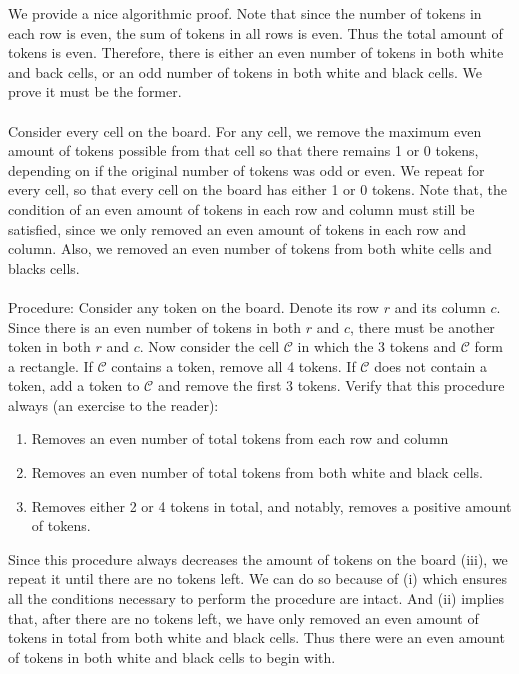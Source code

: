 \begin{enumerate}[align=left,start=1,label=\textbf{\textcolor{meablue}{Problem \arabic*}}]
    \begin{solution}
        We provide a nice algorithmic proof. Note that since the number of tokens in each row is even, the sum of tokens in all rows is even.  Thus the total amount of tokens is even. Therefore, there is either an even number of tokens in both white and back cells, or an odd number of tokens in both white and black cells. We prove it must be the former. 
        \\ \\
        Consider every cell on the board. For any cell, we remove the maximum even amount of tokens possible from that cell so that there remains 1 or 0 tokens, depending on if the original number of tokens was odd or even. We repeat for every cell, so that every cell on the board has either 1 or 0 tokens. Note that, the condition of an even amount of tokens in each row and column must still be satisfied, since we only removed an even amount of tokens in each row and column. Also, we removed an even number of tokens from both white cells and blacks cells.
        \\ \\ 
        Procedure: Consider any token on the board. Denote its row $r$ and its column $c$. Since there is an even number of tokens in both $r$ and $c$, there must be another token in both $r$ and $c$. Now consider the cell $\mathcal{C}$ in which the 3 tokens and $\mathcal{C}$ form a rectangle. If $\mathcal{C}$ contains a token, remove all 4 tokens. If $\mathcal{C}$ does not contain a token, add a token to $\mathcal{C}$ and remove the first 3 tokens. Verify that this procedure always (an exercise to the reader):
        \begin{enumerate}[label=(\roman*)]
            \item Removes an even number of total tokens from each row and column
            \item Removes an even number of total tokens from both white and black cells.
            \item Removes either 2 or 4 tokens in total, and notably, removes a positive amount of tokens.
        \end{enumerate}
        Since this procedure always decreases the amount of tokens on the board (iii), we repeat it until there are no tokens left. We can do so because of (i) which ensures all the conditions necessary to perform the procedure are intact. And (ii) implies that, after there are no tokens left, we have only removed an even amount of tokens in total from both white and black cells. Thus there were an even amount of tokens in both white and black cells to begin with.


\end{solution}
\end{enumerate}
